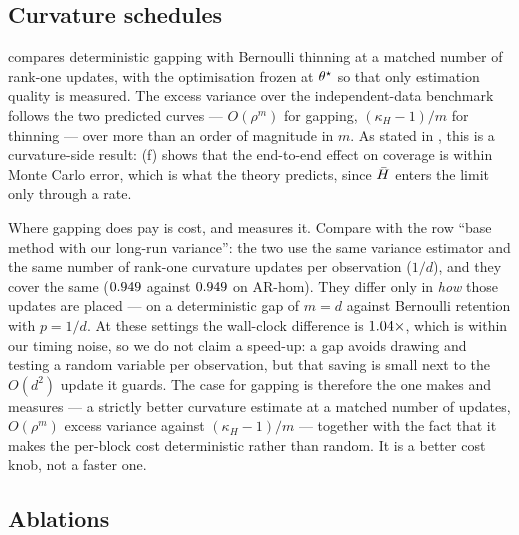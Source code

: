 \subsection{Curvature schedules}
\label{app:sched}

\RefGapFig{} compares deterministic gapping with Bernoulli thinning at a matched number of
rank-one updates, with the optimisation frozen at $\theta^\star$ so that only estimation quality is
measured. The excess variance over the independent-data benchmark follows the two predicted
curves --- $O(\rho^{m})$ for gapping, $(\kappa_H-1)/m$ for thinning --- over more than an
order of magnitude in $m$. As stated in , this is a curvature-side result:
(f) shows that the end-to-end effect on coverage is within Monte Carlo
error, which is what the theory predicts, since $\bar{H}$ enters the limit only through a rate.

Where gapping does pay is cost, and  measures it. Compare \bgsn{} with the row
``base method with our long-run variance'': the two use the same variance estimator and the same
number of rank-one curvature updates per observation ($1/d$), and they cover the same
($0.949$ against $0.949$ on AR-hom). They differ only in \emph{how} those
updates are placed --- on a deterministic gap of $m=d$ against Bernoulli retention with $p=1/d$.
At these settings the wall-clock difference is $1.04\times$, which is within our
timing noise, so we do not claim a speed-up: a gap avoids drawing and testing a random variable
per observation, but that saving is small next to the $O(d^2)$ update it guards. The case for
gapping is therefore the one  makes and \RefGapFig{} measures --- a strictly
better curvature estimate at a matched number of updates, $O(\rho^m)$ excess variance against
$(\kappa_H-1)/m$ --- together with the fact that it makes the per-block cost deterministic
rather than random. It is a better cost knob, not a faster one.
\subsection{Ablations}
\label{app:abl}

